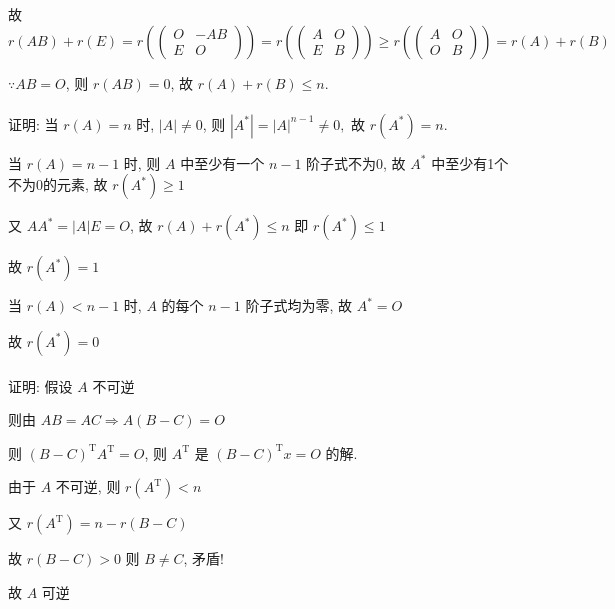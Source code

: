          故 \( r(AB)+r(E) = r(\begin{pmatrix}
             O & -AB \\
             E & O
         \end{pmatrix}) = r(\begin{pmatrix}
             A & O \\
             E & B
         \end{pmatrix}) \geq r(\begin{pmatrix}
             A & O \\
             O & B
         \end{pmatrix}) = r(A)+r(B) \)

         \( \because AB = O \), 则 \( r(AB) = 0 \), 故 \( r(A)+r(B) \leq n \).


     \paragraph{} %
         证明: 当 \( r(A) = n \) 时, \( |A| \neq 0 \), 则 \( |A^{*}| = |A|^{n-1} \neq 0, \text{ 故 } r(A^{*}) = n. \)

         当 \( r(A) = n-1 \) 时, 则 \( A \) 中至少有一个 \( n-1 \) 阶子式不为0, 故
         \( A^{*} \) 中至少有1个不为0的元素, 故 \( r(A^{*}) \geq 1 \)

         又 \( AA^{*} = |A|E = O \), 故 \( r(A)+r(A^{*}) \leq n \) 即 \( r(A^{*}) \leq 1 \)

         故 \( r(A^{*}) = 1 \)

         当 \( r(A) < n-1 \) 时, \( A \) 的每个 \( n-1 \) 阶子式均为零, 故 \( A^{*} = O \)

         故 \( r(A^{*}) = 0 \)


     \paragraph{} %
         证明: 假设 \( A \) 不可逆

         则由 \( AB = AC \Rightarrow A(B-C) = O \)

         则 \( (B-C)^{\mathrm{T}}A^{\mathrm{T}} = O \), 则 \( A^{\mathrm{T}} \) 是 \( (B-C)^{\mathrm{T}}x = O \) 的解.

         由于 \( A \) 不可逆, 则 \( r(A^{\mathrm{T}}) < n \)

         又 \( r(A^{\mathrm{T}}) = n-r(B-C) \)

         故 \( r(B-C) > 0 \) 则 \( B \neq C \), 矛盾!

         故 \( A \) 可逆

